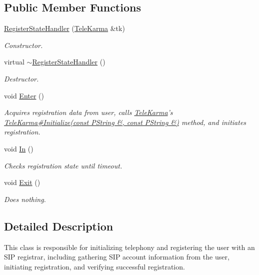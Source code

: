 \subsection*{Public Member Functions}
\begin{CompactItemize}
\item 
\hyperlink{classRegisterStateHandler_146b015654e6136dbc7b183630f51b2b}{RegisterStateHandler} (\hyperlink{classTeleKarma}{TeleKarma} \&tk)
\begin{CompactList}\small\item\em Constructor. \item\end{CompactList}\item 
virtual \hyperlink{classRegisterStateHandler_50abd4cf05e90e206662b94b8eb9e657}{$\sim$RegisterStateHandler} ()
\begin{CompactList}\small\item\em Destructor. \item\end{CompactList}\item 
void \hyperlink{classRegisterStateHandler_ce5bc429d43d18e9233f521c2edf930a}{Enter} ()
\begin{CompactList}\small\item\em Acquires registration data from user, calls \hyperlink{classTeleKarma}{TeleKarma}'s \hyperlink{classTeleKarma_94f24d2895a64c49d1d5daf9a5a40c7e}{TeleKarma\#Initialize(const PString \&, const PString \&)} method, and initiates registration. \item\end{CompactList}\item 
void \hyperlink{classRegisterStateHandler_576721a87410fc48c0264a56a3b3d466}{In} ()
\begin{CompactList}\small\item\em Checks registration state until timeout. \item\end{CompactList}\item 
void \hyperlink{classRegisterStateHandler_ce8f8dd19fb90516d5ee4db4ba1731d7}{Exit} ()
\begin{CompactList}\small\item\em Does nothing. \item\end{CompactList}\end{CompactItemize}


\subsection{Detailed Description}
This class is responsible for initializing telephony and registering the user with an SIP registrar, including gathering SIP account information from the user, initiating registration, and verifying successful registration. 

